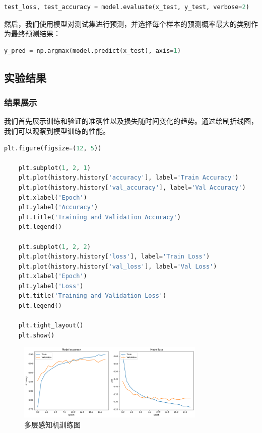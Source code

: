 \documentclass[a4paper,12pt]{article}
\begin{document}
\begin{lstlisting}[language=Python]
	test_loss, test_accuracy = model.evaluate(x_test, y_test, verbose=2)
\end{lstlisting}

然后，我们使用模型对测试集进行预测，并选择每个样本的预测概率最大的类别作为最终预测结果：

\begin{lstlisting}[language=Python]
	y_pred = np.argmax(model.predict(x_test), axis=1)
\end{lstlisting}
\subsection{实验结果}

\subsubsection{结果展示}


我们首先展示训练和验证的准确性以及损失随时间变化的趋势。通过绘制折线图，我们可以观察到模型训练的性能。

\begin{lstlisting}[language=Python]
	plt.figure(figsize=(12, 5))
	
	plt.subplot(1, 2, 1)
	plt.plot(history.history['accuracy'], label='Train Accuracy')
	plt.plot(history.history['val_accuracy'], label='Val Accuracy')
	plt.xlabel('Epoch')
	plt.ylabel('Accuracy')
	plt.title('Training and Validation Accuracy')
	plt.legend()
	
	plt.subplot(1, 2, 2)
	plt.plot(history.history['loss'], label='Train Loss')
	plt.plot(history.history['val_loss'], label='Val Loss')
	plt.xlabel('Epoch')
	plt.ylabel('Loss')
	plt.title('Training and Validation Loss')
	plt.legend()
	
	plt.tight_layout()
	plt.show()
\end{lstlisting}
\begin{figure}[htbp]
	\centering
	\includegraphics[width=0.8\textwidth]{5.png}
	\caption{多层感知机训练图}
\end{figure}
\end{document}
